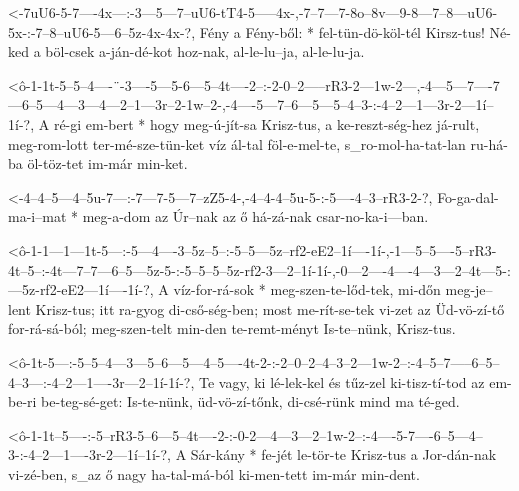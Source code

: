   {<-7uU6-5-7----4x---:-3---5---7--uU6-tT4-5-----4x-,-7--7---7-8o--8v---9-8---7--8---uU6-5x-:-7--8--uU6-5---6--5z-4x-4x-?,}
  {  Fény a Fény-ből: * fel-tün-dö-köl-tél Kirsz-tus! Né-ked a böl-csek a-ján-dé-kot hoz-nak, al-le-lu--ja, al-le-lu-ja.}



  {<ô-1-1t-5--5--4----¨-3----5---5-6---5--4t----2--:-2-0--2-----rR3-2---1w-2---,-4---5---7----7---6--5---4---3---4---2--1---3r--2-1w--2-,-4----5---7--6---5---5--4--3-:-4--2---1---3r-2---1í--1í-?,}
  {   A ré-gi em-bert * hogy meg-ú-jít-sa Krisz-tus, a ke-reszt-ség-hez já-rult, meg-rom-lott ter-mé-sze-tün-ket víz ál-tal föl-e-mel-te, s_ro-mol-ha-tat-lan ru-há-ba  öl-töz-tet im-már min-ket.}


  {<-4--4--5---4--5u-7---:-7---7-5---7--zZ5-4-,-4--4-4--5u-5-:-5----4--3--rR3-2-?,}
  {  Fo-ga-dal-ma-i--mat * meg-a-dom az Úr--nak az ő há-zá-nak csar-no-ka-i---ban.}


  {<ô-1-1---1---1t-5---:-5---4----3--5z--5--:-5--5---5z--rf2-eE2--1í----1í-,-1---5--5----5--rR3-4t--5--:-4t---7--7---6--5---5z-5-:-5--5--5--5z-rf2-3---2--1í-1í-,-0---2----4----4---3---2--4t---5-:---5z-rf2-eE2---1í----1í-?,}
  {   A víz-for-rá-sok * meg-szen-te-lőd-tek, mi-dőn meg-je--lent Krisz-tus; itt ra-gyog di-cső-ség-ben; most me-rít-se-tek vi-zet az Üd-vö-zí-tő  for-rá-sá-ból; meg-szen-telt min-den te-remt-ményt Is-te--nünk, Krisz-tus.}

  {<ô-1t-5---:-5--5--4---3---5--6---5---4--5----4t-2-:-2--0--2--4--3--2---1w-2--:-4--5--7-----6--5--4--3---:-4--2---1----3r---2--1í-1í-?,}
  {   Te vagy, ki lé-lek-kel és tűz-zel ki-tisz-tí-tod az em-be-ri be-teg-sé-get: Is-te-nünk, üd-vö-zí-tőnk, di-csé-rünk mind ma té-ged.}


  {<ô-1-1t--5----:-5--rR3-5--6---5--4t----2-:-0-2---4---3---2--1w-2--:-4----5-7----6--5---4--3-:-4--2---1----3r-2---1í--1í-?,}
  {   A Sár-kány * fe-jét le-tör-te Krisz-tus a Jor-dán-nak vi-zé-ben, s_az ő nagy ha-tal-má-ból ki-men-tett im-már min-dent.}

